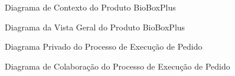 \documentclass[12pt,a4paper]{article}
\begin{document}
\begin{landscape}
  \begin{figure}
    \centering
    
    \caption{Diagrama de Contexto do Produto BioBoxPlus}
    \label{fig:A3-1}
  \end{figure}
\end{landscape}

\begin{landscape}
  \begin{figure}
    \centering
    
    \caption{Diagrama da Vista Geral do Produto BioBoxPlus}
    \label{fig:A4-1}
  \end{figure}
\end{landscape}

\begin{landscape}
  \begin{figure}
    \centering
    
    \caption{Diagrama Privado do Processo de Execução de Pedido}
    \label{fig:B1-1}
  \end{figure}
\end{landscape}

\begin{landscape}
  \begin{figure}
    \centering
    
    \caption{Diagrama de Colaboração do Processo de Execução de Pedido}
    \label{fig:B2-1}
  \end{figure}
\end{landscape}
\end{document}
